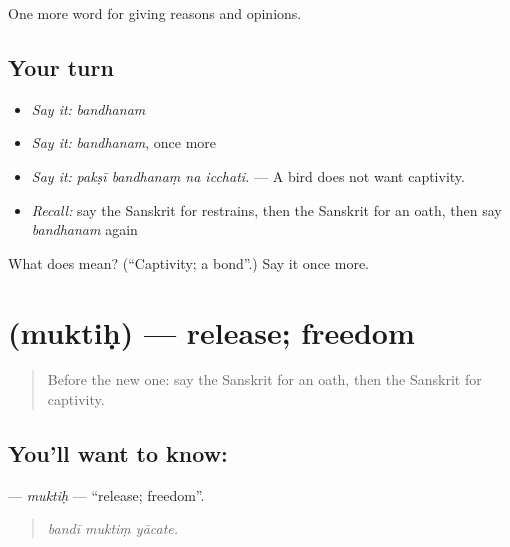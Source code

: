 \begin{grammarlens}[title={What you've built}]
One more word for giving reasons and opinions.
\end{grammarlens}

\subsection*{Your turn}
\begin{itemize}
\raggedright
  \item \emph{Say it:} \emph{bandhanam}
  \item \emph{Say it:} \emph{bandhanam}, once more
  \item \emph{Say it:} \emph{pakṣī bandhanaṃ na icchati.} — A bird does not want captivity.
  \item \emph{Recall:} say the Sanskrit for restrains, then the Sanskrit for an oath, then say \emph{bandhanam} again
\end{itemize}

\begin{tcolorbox}[breakable,colback=teal!4,colframe=teal!35!black,title={Before you move on}]
What does  mean? (\textquotedblleft{}Captivity; a bond\textquotedblright{}.) Say it once more.
\end{tcolorbox}
\section[\texorpdfstring{\sk{मुक्तिः} (muktiḥ)}{मुक्तिः (muktiḥ)}]{ (muktiḥ) — release; freedom}

\label{lesson:SA-C350-muktih}



\begin{quote}
Before the new one: say the Sanskrit for an oath, then the Sanskrit for captivity.
\end{quote}

\subsection*{You'll want to know: }
\textbf{} — \emph{muktiḥ} — \textquotedblleft{}release; freedom\textquotedblright{}.

\begin{quote}
  
\end{quote}

\begin{quote}
\emph{bandī muktiṃ yācate.}
\end{quote}

